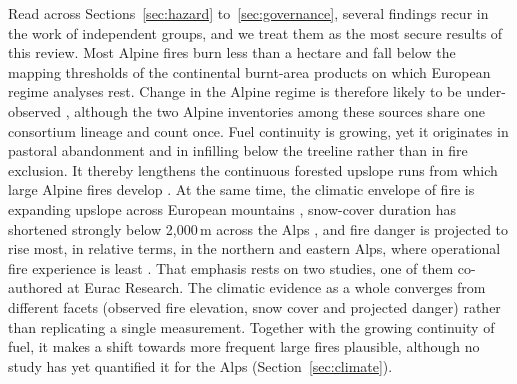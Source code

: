 \documentclass[11pt,a4paper]{article}
\begin{document}
Read across Sections~\ref{sec:hazard} to~\ref{sec:governance}, several findings recur in the work of independent groups, and we treat them as the most secure results of this review. Most Alpine fires burn less than a hectare and fall below the mapping thresholds of the continental burnt-area products on which European regime analyses rest. Change in the Alpine regime is therefore likely to be under-observed \citep{valese_wildfires_2011, muller_forest_2020, beloiu_climatedriven_2026, forrest_understanding_2024}, although the two Alpine inventories among these sources share one consortium lineage and count once. Fuel continuity is growing, yet it originates in pastoral abandonment and in infilling below the treeline rather than in fire exclusion. It thereby lengthens the continuous forested upslope runs from which large Alpine fires develop \citep{garbarino_contrasting_2020, frei_evidence_2023, conedera_linking_2024, muller_forest_2020}. At the same time, the climatic envelope of fire is expanding upslope across European mountains \citep{beloiu_climatedriven_2026}, snow-cover duration has shortened strongly below 2{,}000\,m across the Alps \citep{pepin_climate_2022}, and fire danger is projected to rise most, in relative terms, in the northern and eastern Alps, where operational fire experience is least \citep{gerberding_mapping_2025, miller_climate_2024}. That emphasis rests on two studies, one of them co-authored at Eurac Research. The climatic evidence as a whole converges from different facets (observed fire elevation, snow cover and projected danger) rather than replicating a single measurement. Together with the growing continuity of fuel, it makes a shift towards more frequent large fires plausible, although no study has yet quantified it for the Alps (Section~\ref{sec:climate}).
\end{document}
